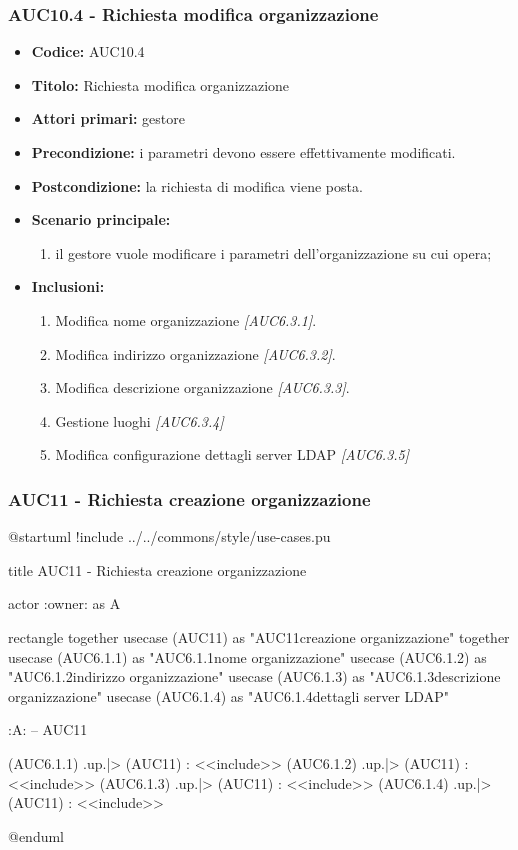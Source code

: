 \documentclass[casi-duso]{subfiles}
\begin{document}
\subsubsection{AUC10.4 - Richiesta modifica organizzazione}%
\label{subsub:AUC10.4}
\begin{itemize}
  \item \textbf{Codice:} AUC10.4
  \item \textbf{Titolo:} Richiesta modifica organizzazione
  \item \textbf{Attori primari:} gestore
  \item \textbf{Precondizione:} i parametri devono essere effettivamente modificati.
  \item \textbf{Postcondizione:} la richiesta di modifica viene posta.
  \item \textbf{Scenario principale:}
  \begin{enumerate}
    \item il gestore vuole modificare i parametri dell'organizzazione su cui opera;
  \end{enumerate}
  \item \textbf{Inclusioni:}
  \begin{enumerate}
    \item Modifica nome organizzazione \emph{[AUC6.3.1]}.
    \item Modifica indirizzo organizzazione \emph{[AUC6.3.2]}.
    \item Modifica descrizione organizzazione \emph{[AUC6.3.3]}.
    \item Gestione luoghi \emph{[AUC6.3.4]} 
    \item Modifica configurazione dettagli server LDAP \emph{[AUC6.3.5]} 
  \end{enumerate}
\end{itemize}

\subsubsection{AUC11 - Richiesta creazione organizzazione}%
\label{subsub:AUC11}

\begin{plantuml}
@startuml
!include ../../commons/style/use-cases.pu

title AUC11 - Richiesta creazione organizzazione

actor :owner: as A

rectangle {
  together {
    usecase (AUC11) as "AUC11\nRichiesta creazione organizzazione"
  }
  together {
    usecase (AUC6.1.1) as "AUC6.1.1\nInserisci nome organizzazione"
    usecase (AUC6.1.2) as "AUC6.1.2\nInserisci indirizzo organizzazione"
    usecase (AUC6.1.3) as "AUC6.1.3\nInserisci descrizione organizzazione"
    usecase (AUC6.1.4) as "AUC6.1.4\nConfigurazione dettagli server LDAP"
  }
}

:A: -- AUC11

(AUC6.1.1) .up.|> (AUC11) : <<include>>
(AUC6.1.2) .up.|> (AUC11) : <<include>>
(AUC6.1.3) .up.|> (AUC11) : <<include>>
(AUC6.1.4) .up.|> (AUC11) : <<include>>

@enduml
\end{plantuml}
\end{document}
